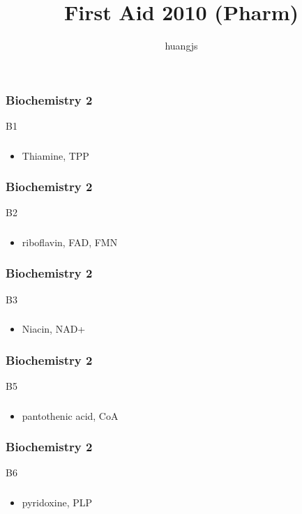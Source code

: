 \documentclass[11pt]{beamer}
\title{First Aid 2010 (Pharm)}
\author{huangjs}
\begin{document}
\begin{frame}
 \frametitle{Biochemistry 2}
B1
\end{frame}

\begin{frame}
 \frametitle{}
\begin{itemize}
\item Thiamine, TPP
\end{itemize}
\end{frame}

\begin{frame}
 \frametitle{Biochemistry 2}
B2
\end{frame}

\begin{frame}
 \frametitle{}
\begin{itemize}
\item riboflavin, FAD, FMN
\end{itemize}
\end{frame}

\begin{frame}
 \frametitle{Biochemistry 2}
B3
\end{frame}

\begin{frame}
 \frametitle{}
\begin{itemize}
\item Niacin, NAD+
\end{itemize}
\end{frame}

\begin{frame}
 \frametitle{Biochemistry 2}
B5
\end{frame}

\begin{frame}
 \frametitle{}
\begin{itemize}
\item pantothenic acid, CoA 
\end{itemize}
\end{frame}

\begin{frame}
 \frametitle{Biochemistry 2}
B6
\end{frame}

\begin{frame}
 \frametitle{}
\begin{itemize}
\item pyridoxine, PLP
\end{itemize}
\end{frame}
\end{document}
